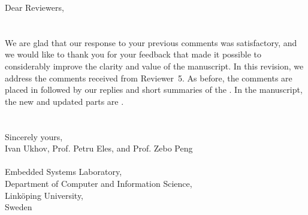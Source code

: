 Dear Reviewers,
\\
\\
\\
\noindent We are glad that our response to your previous comments was satisfactory, and we would like to thank you for your feedback that made it possible to considerably improve the clarity and value of the manuscript.
In this revision, we address the comments received from Reviewer~5.
As before, the comments are placed in  followed by our replies and short summaries of the .
In the manuscript, the new and updated parts are .
\\
\\
\\
\noindent Sincerely yours,\\
Ivan Ukhov, Prof. Petru Eles, and Prof. Zebo Peng
\\
\\
\noindent Embedded Systems Laboratory,\\
Department of Computer and Information Science,\\
Link\"{o}ping University,\\
Sweden
